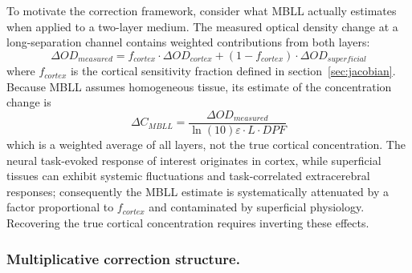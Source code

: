 \documentclass[11pt]{article}
\def\mathrm#1{#1}%
\def\,{ }%
\begin{document}
To motivate the correction framework, consider what MBLL actually estimates when applied to a two-layer medium. The measured optical density change at a long-separation channel contains weighted contributions from both layers:
\begin{equation}
\Delta\mathrm{OD}_{\mathrm{measured}} = f_{\mathrm{cortex}} \cdot \Delta\mathrm{OD}_{\mathrm{cortex}} + (1 - f_{\mathrm{cortex}}) \cdot \Delta\mathrm{OD}_{\mathrm{superficial}}
\label{eq:od_layers}
\end{equation}
where $f_{\mathrm{cortex}}$ is the cortical sensitivity fraction defined in section~\ref{sec:jacobian}. Because MBLL assumes homogeneous tissue, its estimate of the concentration change is
\begin{equation}
\Delta C_{\mathrm{MBLL}} = \frac{\Delta\mathrm{OD}_{\mathrm{measured}}}{\ln(10)\,\varepsilon \cdot L \cdot \mathrm{DPF}}
\label{eq:mbll_bias_origin}
\end{equation}
which is a weighted average of all layers, not the true cortical concentration. The neural task-evoked response of interest originates in cortex, while superficial tissues can exhibit systemic fluctuations and task-correlated extracerebral responses; consequently the MBLL estimate is systematically attenuated by a factor proportional to $f_{\mathrm{cortex}}$ and contaminated by superficial physiology. Recovering the true cortical concentration requires inverting these effects.

\subsubsection{Multiplicative correction structure.}
\end{document}
